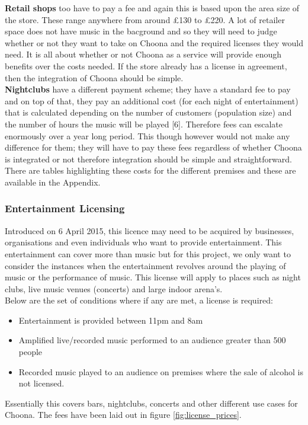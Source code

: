 \textbf{Retail shops} too have to pay a fee and again this is based upon the area size of the store.  These range anywhere from around £130 to £220.  A lot of retailer space does not have music in the bacground and so they will need to judge whether or not they want to take on Choona and the required licenses they would need. It is all about whether or not Choona as a service will provide enough benefits over the costs needed.  If the store already has a license in agreement, then the integration of Choona should be simple.  \\
\textbf{Nightclubs} have a different payment scheme; they have a standard fee to pay and on top of that, they pay an additional cost (for each night of entertainment) that is calculated depending on the number of customers (population size) and the number of hours the music will be played [6].  Therefore fees can escalate enormously over a year long period.  This though however would not make any difference for them; they will have to pay these fees regardless of whether Choona is integrated or not therefore integration should be simple and straightforward.  
There are tables highlighting these costs for the different premises and these are available in the Appendix.  
      
\subsubsection{Entertainment Licensing}   
Introduced on 6 April 2015, this licence may need to be acquired by businesses, organisations and even individuals who want to provide entertainment.  This entertainment can cover more than music but for this project, we only want to consider the instances when the entertainment revolves around the playing of music or the performance of music.  This license will apply to places such as night clubs, live music venues (concerts) and large indoor arena's.  \\
Below are the set of conditions where if any are met, a license is required:
\begin{itemize}
\item Entertainment is provided between 11pm and 8am
\item Amplified live/recorded music performed to an audience greater than 500 people
\item Recorded music played to an audience on premises where the sale of alcohol is not licensed.
\end{itemize}
Essentially this covers bars, nightclubs, concerts and other different use cases for Choona.  The fees have been laid out in figure \ref{fig:license_prices}.\\ 

